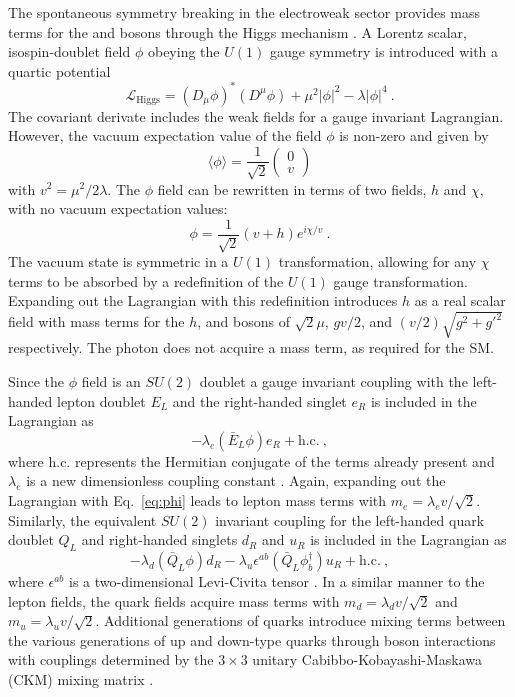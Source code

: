 The spontaneous symmetry breaking in the electroweak sector provides mass
terms for the \PW and \PZ bosons through the Higgs mechanism
\cite{PhysRevLett.13.321,PhysRevLett.13.508,PhysRevLett.13.585}. A Lorentz
scalar, isospin-doublet field $\phi$ obeying the $U(1)$ gauge symmetry is
introduced with a quartic potential
%
\begin{equation}
    \mathcal{L}_{\mathrm{Higgs}} = (D_\mu\phi)^*(D^\mu\phi) +\mu^2|\phi|^2 - \lambda|\phi|^4\ .
\end{equation}
%
The covariant derivate includes the weak fields for a gauge invariant Lagrangian. However, the vacuum expectation value of the field $\phi$ is non-zero and given by
%
\begin{equation}
    \langle \phi \rangle = \frac{1}{\sqrt{2}}
    \begin{pmatrix}
        0 \\ v
    \end{pmatrix}
\end{equation}
%
with $v^2=\mu^2/2\lambda$. The $\phi$ field can be rewritten in terms of two fields, $h$ and $\chi$, with no vacuum expectation values:
%
\begin{equation}\label{eq:phi}
    \phi = \frac{1}{\sqrt{2}}(v + h)e^{i\chi/v}\ .
\end{equation}
%
The vacuum state is symmetric in a $U(1)$ transformation, allowing for any
$\chi$ terms to be absorbed by a redefinition of the $U(1)$ gauge
transformation. Expanding out the Lagrangian with this redefinition introduces
$h$ as a real scalar field with mass terms for the $h$, \PW and \PZ bosons of
$\sqrt{2}\mu$, $gv/2$, and $(v/2)\sqrt{g^2+g'^2}$ respectively. The photon
does not acquire a mass term, as required for the SM.

Since the $\phi$ field is an $SU(2)$ doublet a gauge invariant coupling with
the left-handed lepton doublet $E_L$ and the right-handed singlet $e_R$ is
included in the Lagrangian as
%
\begin{equation}
    -\lambda_e (\bar{E}_L \phi) e_R + \mathrm{h.c.}\ ,
\end{equation}
%
where h.c. represents the Hermitian conjugate of the terms already present and
$\lambda_e$ is a new dimensionless coupling constant \cite{Peskin:1995ev}.
Again, expanding out the Lagrangian with Eq.~\ref{eq:phi} leads to lepton mass
terms with $m_e = \lambda_e v/\sqrt{2}$. Similarly, the equivalent $SU(2)$
invariant coupling for the left-handed quark doublet $Q_L$ and right-handed
singlets $d_R$ and $u_R$ is included in the Lagrangian as
%
\begin{equation}
    -\lambda_d (\bar{Q}_L\phi) d_R - \lambda_u \epsilon^{ab}(\bar{Q}_L\phi_b^{\dagger})u_R + \mathrm{h.c.}\ ,
\end{equation}
%
where $\epsilon^{ab}$ is a two-dimensional Levi-Civita tensor \cite{Peskin:1995ev}.
In a similar manner to the lepton fields, the quark fields acquire mass terms
with $m_d = \lambda_d v/\sqrt{2}$ and $m_u = \lambda_u v/\sqrt{2}$. Additional
generations of quarks introduce mixing terms between the various generations
of up and down-type quarks through \PW boson interactions with couplings
determined by the $3\times 3$ unitary Cabibbo-Kobayashi-Maskawa (CKM) mixing
matrix \cite{PhysRevLett.10.531,Kobayashi:1973fv}.

